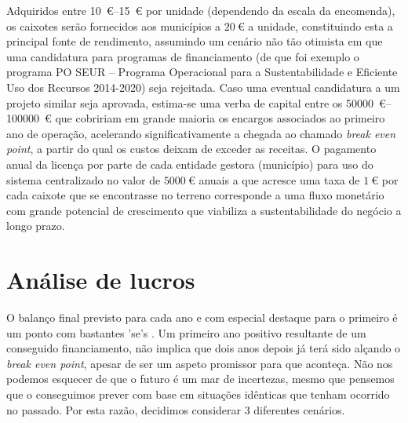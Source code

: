 \documentclass[11pt, a4paper, oneside]{book}
\begin{document}
Adquiridos entre \SIrange{10}{15}{\euro} por unidade (dependendo da escala da encomenda), os caixotes serão fornecidos aos municípios a $\SI{20}{\euro}$ a unidade, constituindo esta a principal fonte de rendimento, assumindo um cenário não tão otimista em que uma candidatura para programas de financiamento (de que foi exemplo o programa PO SEUR -- Programa Operacional para a Sustentabilidade e Eficiente Uso dos Recursos 2014-2020) seja rejeitada. Caso uma eventual candidatura a um projeto similar seja aprovada, estima-se uma verba de capital entre os \SIrange{50000}{100000}{\euro} que cobririam em grande maioria os encargos associados ao primeiro ano de operação, acelerando significativamente a chegada ao chamado \textit{break even point}, a partir do qual os custos deixam de exceder as receitas.
O pagamento anual da licença por parte de cada entidade gestora (município) para uso do sistema centralizado no valor de $\SI{5000}{\euro}$ anuais a que acresce uma taxa de $\SI{1}{\euro}$ por cada caixote que se encontrasse no terreno corresponde a uma fluxo monetário com grande potencial de crescimento que viabiliza a sustentabilidade do negócio a longo prazo.

\section{Análise de lucros}

O balanço final previsto para cada ano e com especial destaque para o primeiro é um ponto com bastantes 'se's . Um primeiro ano positivo resultante de um conseguido financiamento, não implica que dois anos depois já terá sido alçando o \textit{break even point}, apesar de ser um aspeto promissor para que aconteça. Não nos podemos esquecer de que o futuro é um mar de incertezas, mesmo que pensemos que o conseguimos prever com base em situações idênticas que tenham ocorrido no passado. Por esta razão, decidimos considerar 3 diferentes cenários.
\end{document}

